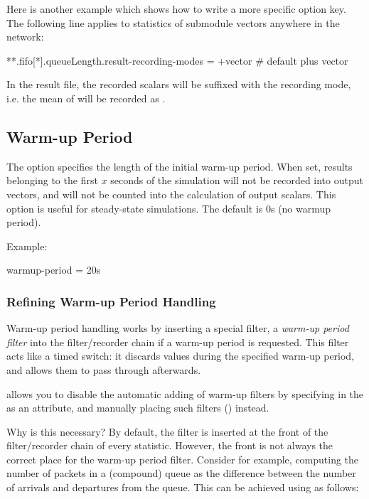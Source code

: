 Here is another example which shows how to write a more specific option
key. The following line applies to  statistics of
 submodule vectors anywhere in the network:

\begin{inifile}
**.fifo[*].queueLength.result-recording-modes = +vector  # default plus vector
\end{inifile}

In the result file, the recorded scalars will be suffixed with the recording mode,
i.e. the mean of  will be recorded as .


\subsection{Warm-up Period}
\label{sec:ana-sim:warmup-period}

The  option specifies the length of the initial
warm-up period. When set, results belonging to the first $x$ seconds
of the simulation will not be recorded into output vectors, and will
not be counted into the calculation of output scalars.
This option is useful for steady-state simulations. The default is 0s
(no warmup period).

Example:

\begin{inifile}
warmup-period = 20s
\end{inifile}


\subsubsection{Refining Warm-up Period Handling}
\label{sec:ana-sim:refining-warmup-period-handling}

Warm-up period handling works by inserting a special filter, a \textit{warm-up
period filter} into the filter/recorder chain if a warm-up period is requested.
This filter acts like a timed switch: it discards values during the specified warm-up
period, and allows them to pass through afterwards.

{\opp} allows you to disable the automatic adding of warm-up filters by
specifying  in the  as an attribute,
and manually placing such filters () instead.

Why is this necessary? By default, the filter is inserted at the front of the
filter/recorder chain of every statistic. However, the front is not always the
correct place for the warm-up period filter. Consider for example, computing the
number of packets in a (compound) queue as the difference between the number of
arrivals and departures from the queue. This can be achieved using
 as follows:

